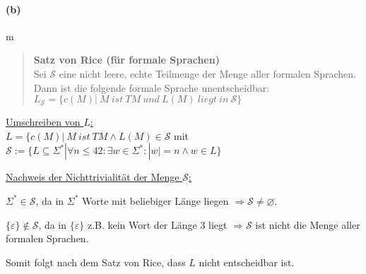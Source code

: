 	\vspace{0.3cm}

\paragraph{(b)}m
	\begin{quote}	
		\textbf{Satz von Rice (für formale Sprachen)}\\
		Sei $\mathcal{S} $ eine nicht leere, echte Teilmenge der Menge aller formalen Sprachen.\\
		Dann ist die folgende formale Sprache unentscheidbar:\\
		$L_\mathcal{S}  = \{c(M) |\ M\ ist\ TM\ und\ L(M)\ liegt\ in\ \mathcal{S}\}$
	\end{quote}
	
	\underline{Umschreiben von $L$:}\\
	$L=\{c(M)|\ M\ ist\ TM \wedge L(M) \in \mathcal{S}$ mit $\mathcal{S} := \{L\subseteq \Sigma^* | \forall n \leq 42: \exists w \in \Sigma^*: |w|=n \wedge w \in L\}$

	\underline{Nachweis der Nichttrivialität der Menge $\mathcal{S}$:}

	$\Sigma^* \in \mathcal{S}$, da in $\Sigma^*$ Worte mit beliebiger Länge liegen $\Rightarrow \mathcal{S} \neq \varnothing$.

	$\{\varepsilon\} \notin \mathcal{S}$, da in $\{\varepsilon\}$ z.B. kein Wort der Länge 3 liegt $\Rightarrow \mathcal{S}$ ist nicht die Menge aller formalen Sprachen.

	Somit folgt nach dem Satz von Rice, dass $L$ nicht entscheidbar ist.